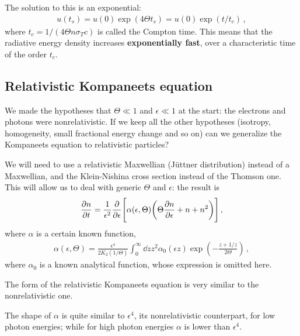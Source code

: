 \documentclass[main.tex]{subfiles}
\begin{document}
The solution to this is an exponential: 
%
\begin{align}
u(t_s) = u(0 ) \exp( 4 \Theta t_s) = u(0 ) \exp( t / t_c )
\,,
\end{align}
%
where \(t_c = 1/ (4 \Theta n \sigma _T c)\) is called the Compton time. 
This means that the radiative energy density increases \textbf{exponentially fast}, over a characteristic time of the order \(t_c\). 


\subsection{Relativistic Kompaneets equation}

We made the hypotheses that \(\Theta \ll 1\) and \(\epsilon \ll 1\) at the start: the electrons and photons were nonrelativistic.
If we keep all the other hypotheses (isotropy, homogeneity, small fractional energy change and so on) can we generalize the Kompaneets equation to relativistic particles?

We will need to use a relativistic Maxwellian (Jüttner distribution) instead of a Maxwellian, and the Klein-Nishina cross section instead of the Thomson one. This will allow us to deal with generic \(\Theta \) and \(\epsilon \): the result is 
%
\begin{align}
\pdv{n}{t} = \frac{1}{\epsilon^2} \pdv{}{\epsilon } \qty[ \alpha (\epsilon , \Theta ) \qty(\Theta \pdv{n}{\epsilon } + n + n^2)]
\,,
\end{align}
%
where \(\alpha \) is a certain known function, 
%
\begin{align}
\alpha (\epsilon , \Theta ) = \frac{\epsilon^4}{2 K_2 (1 / \Theta )} \int_0^{\infty } \dd{z} z^2 \alpha_0 (\epsilon z) \exp( - \frac{z + 1/z}{2 \Theta })
\,,
\end{align}
%
where \(\alpha_0\) is a known analytical function, whose expression is omitted here. 

The form of the relativistic Kompaneets equation is very similar to the nonrelativistic one. 

The shape of \(\alpha \) is quite similar to \(\epsilon^4\), its nonrelativistic counterpart, for low photon energies; while for high photon energies \(\alpha \) is lower than \(\epsilon^4\). 
\end{document}
